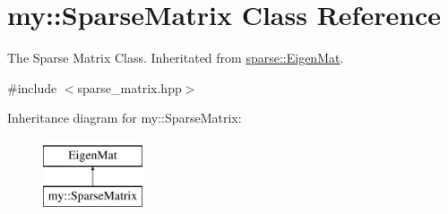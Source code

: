 \hypertarget{classmy_1_1SparseMatrix}{\section{my\+:\+:Sparse\+Matrix Class Reference}
\label{classmy_1_1SparseMatrix}
}


The Sparse Matrix Class. Inheritated from \hyperlink{namespacesparse_af3fe1ceb08995f6d08e5f96fbbe021bf}{sparse\+::\+Eigen\+Mat}.  




{\ttfamily \#include $<$sparse\+\_\+matrix.\+hpp$>$}

Inheritance diagram for my\+:\+:Sparse\+Matrix\+:\begin{figure}[H]
\begin{center}
\leavevmode
\includegraphics[height=2.000000cm]{classmy_1_1SparseMatrix}
\end{center}
\end{figure}
